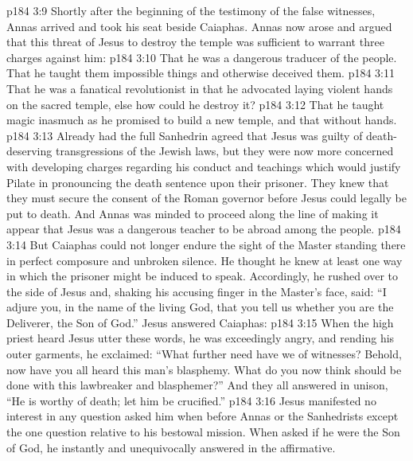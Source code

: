 \vs p184 3:9 Shortly after the beginning of the testimony of the false witnesses, Annas arrived and took his seat beside Caiaphas. Annas now arose and argued that this threat of Jesus to destroy the temple was sufficient to warrant three charges against him:
\vs p184 3:10 \bibnobreakspace That he was a dangerous traducer of the people. That he taught them impossible things and otherwise deceived them.
\vs p184 3:11 \bibnobreakspace That he was a fanatical revolutionist in that he advocated laying violent hands on the sacred temple, else how could he destroy it?
\vs p184 3:12 \bibnobreakspace That he taught magic inasmuch as he promised to build a new temple, and that without hands.
\vs p184 3:13 \pc Already had the full Sanhedrin agreed that Jesus was guilty of death\hyp{}deserving transgressions of the Jewish laws, but they were now more concerned with developing charges regarding his conduct and teachings which would justify Pilate in pronouncing the death sentence upon their prisoner. They knew that they must secure the consent of the Roman governor before Jesus could legally be put to death. And Annas was minded to proceed along the line of making it appear that Jesus was a dangerous teacher to be abroad among the people.
\vs p184 3:14 But Caiaphas could not longer endure the sight of the Master standing there in perfect composure and unbroken silence. He thought he knew at least one way in which the prisoner might be induced to speak. Accordingly, he rushed over to the side of Jesus and, shaking his accusing finger in the Master’s face, said: “I adjure you, in the name of the living God, that you tell us whether you are the Deliverer, the Son of God.” Jesus answered Caiaphas: 
\vs p184 3:15 When the high priest heard Jesus utter these words, he was exceedingly angry, and rending his outer garments, he exclaimed: “What further need have we of witnesses? Behold, now have you all heard this man’s blasphemy. What do you now think should be done with this lawbreaker and blasphemer?” And they all answered in unison, “He is worthy of death; let him be crucified.”
\vs p184 3:16 Jesus manifested no interest in any question asked him when before Annas or the Sanhedrists except the one question relative to his bestowal mission. When asked if he were the Son of God, he instantly and unequivocally answered in the affirmative.
